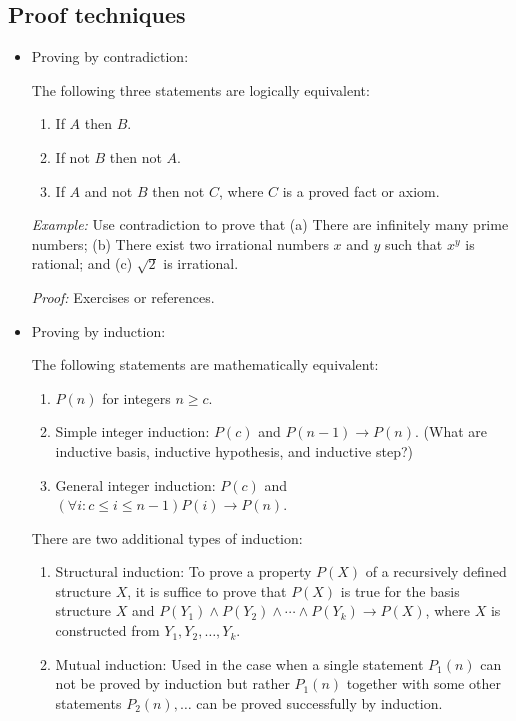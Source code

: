 \documentclass{article}
\begin{document}
\subsection{Proof techniques}

\begin{itemize}

\item Proving by contradiction: 

The following three statements are logically equivalent:

\begin{enumerate}
\item If $A$ then $B$.
\item If not $B$ then not $A$.
\item If $A$ and not $B$ then not $C$, where $C$ is a proved fact or axiom.
\end{enumerate}

{\em Example:} Use contradiction to prove that 
(a) There are infinitely many prime numbers; (b) There exist two
irrational numbers $x$ and $y$ such that $x^y$ is rational; and
(c) $\sqrt 2$ is irrational.

{\em Proof:} Exercises or references.

\item Proving by induction:

The following statements are mathematically equivalent:

\begin{enumerate}
\item $P(n)$ for integers $n\ge c$.
\item Simple integer induction: $P(c)$ and $P(n-1)\rightarrow P(n)$. 
(What are inductive basis, inductive hypothesis, and inductive step?) 
\item General integer induction: $P(c)$ and $(\forall i:c\le i\le n-1)
P(i)\rightarrow P(n)$.
\end{enumerate}

There are two additional types of induction:

\begin{enumerate}
\item Structural induction: To prove a property $P(X)$ of a recursively
defined structure $X$, it is suffice to prove that $P(X)$ is true for
the basis structure $X$ and $P(Y_1)\land P(Y_2)\land\cdots\land P(Y_k)
\rightarrow P(X)$, where $X$ is constructed from $Y_1, Y_2, \ldots, Y_k$.
\item Mutual induction: Used in the case when a single statement
$P_1(n)$ can not be proved by induction but rather $P_1(n)$ together
with some other statements $P_2(n),\ldots$ can be proved successfully
by induction.
\end{enumerate}


\end{itemize}
\end{document}
